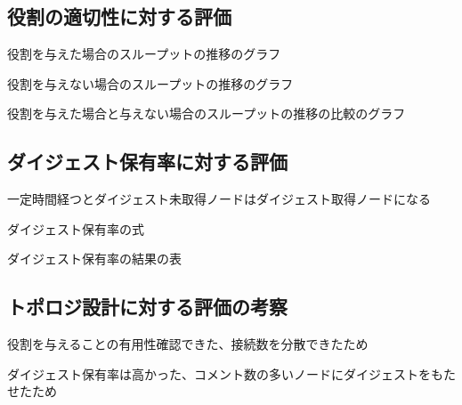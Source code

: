 \subsection{役割の適切性に対する評価}
役割を与えた場合のスループットの推移のグラフ

役割を与えない場合のスループットの推移のグラフ

役割を与えた場合と与えない場合のスループットの推移の比較のグラフ

\subsection{ダイジェスト保有率に対する評価}
一定時間経つとダイジェスト未取得ノードはダイジェスト取得ノードになる

ダイジェスト保有率の式

ダイジェスト保有率の結果の表

\subsection{トポロジ設計に対する評価の考察}
役割を与えることの有用性確認できた、接続数を分散できたため

ダイジェスト保有率は高かった、コメント数の多いノードにダイジェストをもたせたため


